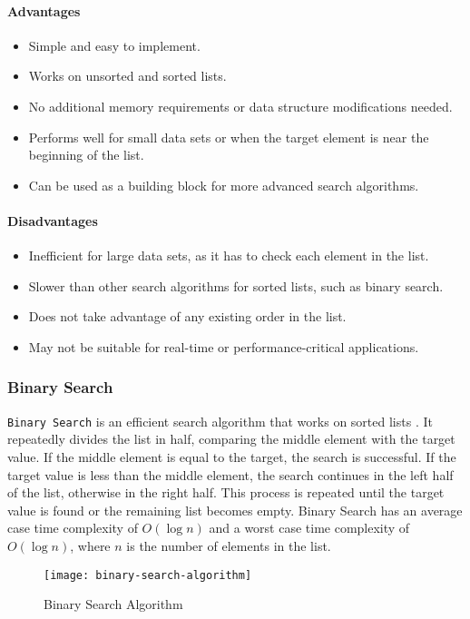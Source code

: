\paragraph{Advantages}
\begin{itemize}
    \item Simple and easy to implement.
    \item Works on unsorted and sorted lists.
    \item No additional memory requirements or data structure modifications needed.
    \item Performs well for small data sets or when the target element is near the beginning of the list.
    \item Can be used as a building block for more advanced search algorithms.
\end{itemize}
\paragraph{Disadvantages}
\begin{itemize}
    \item Inefficient for large data sets, as it has to check each element in the list.
    \item Slower than other search algorithms for sorted lists, such as binary search.
    \item Does not take advantage of any existing order in the list.
    \item May not be suitable for real-time or performance-critical applications.
\end{itemize}

\subsubsection{Binary Search}
\lstinline{Binary Search} is an efficient search algorithm that works on sorted lists \cite{popovi_binary_search}. It repeatedly divides the list in half, comparing the middle element with the target value. If the middle element is equal to the target, the search is successful. If the target value is less than the middle element, the search continues in the left half of the list, otherwise in the right half. This process is repeated until the target value is found or the remaining list becomes empty. Binary Search has an average case time complexity of $O(\log n)$ and a worst case time complexity of $O(\log n)$, where $n$ is the number of elements in the list.

\begin{figure}[H]
    \centering
    \texttt{[image: binary-search-algorithm]}
    \caption{Binary Search Algorithm \cite{jamie_binary_search}}
    \label{fig:binary-search-algorithm}
\end{figure}

